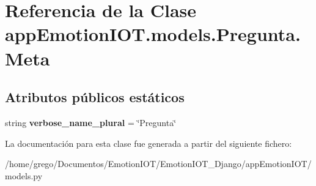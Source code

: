 \hypertarget{classappEmotionIOT_1_1models_1_1Pregunta_1_1Meta}{}\section{Referencia de la Clase app\+Emotion\+I\+O\+T.\+models.\+Pregunta.\+Meta}
\label{classappEmotionIOT_1_1models_1_1Pregunta_1_1Meta}
\subsection*{Atributos públicos estáticos}
\begin{DoxyCompactItemize}
\item 
string {\bfseries verbose\+\_\+name\+\_\+plural} = \char`\"{}Pregunta\char`\"{}\hypertarget{classappEmotionIOT_1_1models_1_1Pregunta_1_1Meta_afd8cb290db815835d4e49ebd812988ec}{}\label{classappEmotionIOT_1_1models_1_1Pregunta_1_1Meta_afd8cb290db815835d4e49ebd812988ec}

\end{DoxyCompactItemize}


La documentación para esta clase fue generada a partir del siguiente fichero\+:\begin{DoxyCompactItemize}
\item 
/home/grego/\+Documentos/\+Emotion\+I\+O\+T/\+Emotion\+I\+O\+T\+\_\+\+Django/app\+Emotion\+I\+O\+T/models.\+py\end{DoxyCompactItemize}
